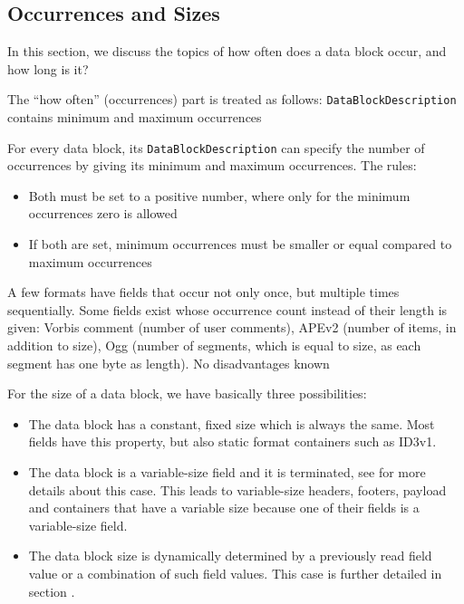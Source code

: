 \subsection{Occurrences and Sizes}%
\label{sec:Sizes}%

In this section, we discuss the topics of how often does a data block occur, and how long is it?

The ``how often'' (occurrences) part is treated as follows:
{%
\texttt{DataBlockDescription} contains minimum and maximum occurrences
}
{%
For every data block, its \texttt{DataBlockDescription} can specify the number of occurrences by giving its minimum and maximum occurrences. The rules:
\begin{itemize}
\item Both must be set to a positive number, where only for the minimum occurrences zero is allowed
\item If both are set, minimum occurrences must be smaller or equal compared to maximum occurrences
\end{itemize}
}
{%
A few formats have fields that occur not only once, but multiple times sequentially. Some fields exist whose occurrence count instead of their length is given: Vorbis comment (number of user comments), APEv2 (number of items, in addition to size), Ogg (number of segments, which is equal to size, as each segment has one byte as length).
}
{%
No disadvantages known
}
 
For the size of a data block, we have basically three possibilities:
\begin{itemize}
\item The data block has a constant, fixed size which is always the same. Most fields have this property, but also static format containers such as ID3v1. 
\item The data block is a variable-size field and it is terminated, see  for more details about this case. This leads to variable-size headers, footers, payload and containers that have a variable size because one of their fields is a variable-size field.
\item The data block size is dynamically determined by a previously read field value or a combination of such field values. This case is further detailed in section .
\end{itemize}

